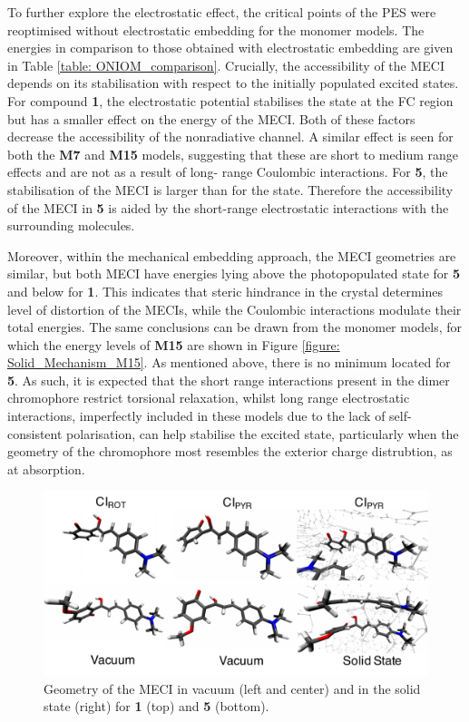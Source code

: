 To further explore the electrostatic effect, the critical points of the \ac{PES} were reoptimised without electrostatic embedding for the monomer models. The energies in comparison to those obtained with electrostatic embedding are given in Table \ref{table: ONIOM_comparison}. Crucially, the accessibility of the MECI depends on its stabilisation with respect to the initially populated excited states. For compound \textbf{1}, the electrostatic potential stabilises the \sone{} state at the FC region but has a smaller effect on the energy of the MECI. Both of these factors decrease the accessibility of the nonradiative channel. A similar effect is seen for both the \textbf{M7} and \textbf{M15} models, suggesting that these are short to medium range effects and are not as a result of long- range Coulombic interactions. For \textbf{5}, the stabilisation of the MECI is larger than for the \sone{} state. Therefore the accessibility of the MECI in \textbf{5} is aided by the short-range electrostatic interactions with the surrounding molecules. 

Moreover, within the mechanical embedding approach, the MECI geometries are similar, but both MECI have energies lying above the photopopulated state for \textbf{5} and below for \textbf{1}. This indicates that steric hindrance in the crystal determines level of distortion of the MECIs, while the Coulombic interactions modulate their total energies. The same conclusions can be drawn from the monomer models, for which the energy levels of \textbf{M15} are shown in Figure \ref{figure: Solid_Mechanism_M15}. As mentioned above, there is  no \Estar{} minimum located for \textbf{5}. As such, it is expected that the short range interactions present in the dimer chromophore restrict torsional relaxation, whilst long range electrostatic interactions, imperfectly included in these models due to the lack of self-consistent polarisation, can help stabilise the excited state, particularly when the geometry of the chromophore most resembles the exterior charge distrubtion, as at absorption.

\begin{figure}
\centering
  \includegraphics[width=0.8\linewidth]{4IntraInterInteractions/HC_1_5_conicals.pdf}
  \caption[Comparison of vacuum and solid state conical intersections]{Geometry of the \Kstar{} MECI in vacuum (left and center) and in the solid state (right) for \textbf{1} (top) and \textbf{5} (bottom).}
  \label{figure: HC_1_5_conicals}
\end{figure}

